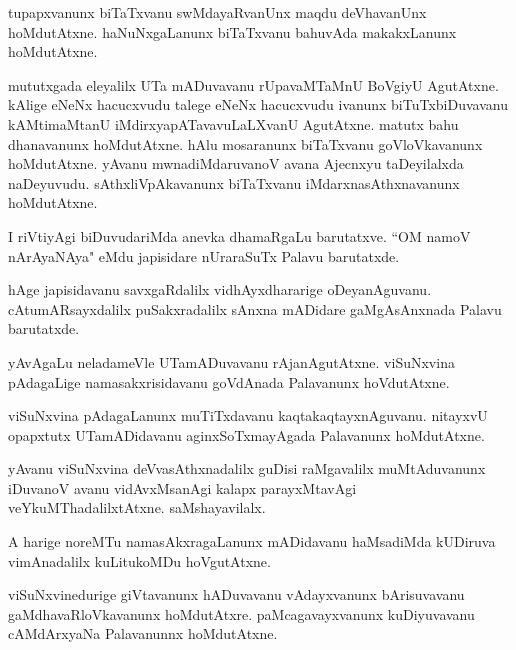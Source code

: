 \documentclass{article}
\begin{document}
\begin{mn}%
tupapxvanunx biTaTxvanu swMdayaRvanUnx maqdu deVhavanUnx hoMdutAtxne. haNuNxgaLanunx biTaTxvanu 
bahuvAda makakxLanunx hoMdutAtxne.
\end{mn}

\begin{mn}%
mututxgada eleyalilx UTa mADuvavanu rUpavaMTaMnU BoVgiyU AgutAtxne. kAlige eNeNx hacucxvudu talege 
eNeNx hacucxvudu ivanunx biTuTxbiDuvavanu kAMtimaMtanU iMdirxyapATavavuLaLXvanU AgutAtxne. matutx 
bahu dhanavanunx hoMdutAtxne. hAlu mosaranunx biTaTxvanu goVloVkavanunx hoMdutAtxne. yAvanu 
mwnadiMdaruvanoV avana Ajecnxyu taDeyilalxda naDeyuvudu. sAthxliVpAkavanunx biTaTxvanu 
iMdarxnasAthxnavanunx hoMdutAtxne.
\end{mn}

\begin{mn}%
I riVtiyAgi biDuvudariMda anevka dhamaRgaLu barutatxve. ``OM namoV nArAyaNAya" eMdu japisidare 
nUraraSuTx Palavu barutatxde.
\end{mn}

\begin{mn}%
hAge japisidavanu savxgaRdalilx vidhAyxdhararige oDeyanAguvanu. cAtumARsayxdalilx puSakxradalilx 
sAnxna mADidare gaMgAsAnxnada Palavu barutatxde.
\end{mn}

\begin{mn}%
yAvAgaLu neladameVle UTamADuvavanu rAjanAgutAtxne. viSuNxvina pAdagaLige namasakxrisidavanu 
goVdAnada Palavanunx hoVdutAtxne.
\end{mn}

\begin{mn}%
viSuNxvina pAdagaLanunx muTiTxdavanu kaqtakaqtayxnAguvanu. nitayxvU opapxtutx UTamADidavanu 
aginxSoTxmayAgada Palavanunx hoMdutAtxne.
\end{mn}

\begin{mn}%
yAvanu viSuNxvina deVvasAthxnadalilx guDisi raMgavalilx muMtAduvanunx iDuvanoV avanu vidAvxMsanAgi 
kalapx parayxMtavAgi veYkuMThadalilxtAtxne. saMshayavilalx.
\end{mn}

\begin{mn}%
A harige noreMTu namasAkxragaLanunx mADidavanu haMsadiMda kUDiruva vimAnadalilx kuLitukoMDu 
hoVgutAtxne.
\end{mn}

\begin{mn}%
viSuNxvinedurige giVtavanunx hADuvavanu vAdayxvanunx bArisuvavanu gaMdhavaRloVkavanunx hoMdutAtxre. 
paMcagavayxvanunx kuDiyuvavanu cAMdArxyaNa Palavanunnx hoMdutAtxne.
\end{mn}
\end{document}
